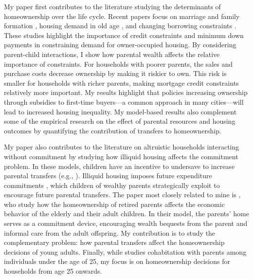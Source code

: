\documentclass[12pt]{article}
\begin{document}

My paper first contributes to the literature studying the determinants of homeownership over the life cycle. Recent papers focus on marriage and family formation \citep{Fisher2011,Chang2024,Khorunzhina2019}, housing demand in old age \citep{McGee2019,Barczyk2020a}, and changing borrowing constraints \citep{Paz-Pardo2019,Mabille2020}. These studies highlight the importance of credit constraints and minimum down payments in constraining demand for owner-occupied housing. By considering parent-child interactions, I show how parental wealth affects the relative importance of constraints. For households with poorer parents, the sales and purchase costs decrease ownership by making it riskier to own. This risk is smaller for households with richer parents, making mortgage credit constraints relatively more important. My results highlight that policies increasing ownership through subsidies to first-time buyers---a common approach in many cities---will lead to increased housing inequality. My model-based results also complement some of the empirical research on the effect of parental resources and housing outcomes \citep[see e.g.,][ for recent work]{wold2024housing,daysal2023intergenerational,benetton2022dynastic} by quantifying the contribution of transfers to homeownership.

My paper also contributes to the literature on altruistic households interacting without commitment by studying how illiquid housing affects the commitment problem. In these models, children have an incentive to undersave to increase parental transfers (e.g., \citealp{Altonji1997a,Boar2018,Barczyk2014,Chu2020}). Illiquid housing imposes future expenditure commitments \citep{Chetty2007,Shore2010}, which children of wealthy parents strategically exploit to encourage future parental transfers. The paper most closely related to mine is \cite{Barczyk2020a}, who study how the homeownership of retired parents affects the economic behavior of the elderly and their adult children. In their model, the parents' home serves as a commitment device, encouraging wealth bequests from the parent and informal care from the adult offspring. My contribution is to study the complementary problem: how parental transfers affect the homeownership decisions of young adults. Finally, while \cite{kaplan2012moving} studies cohabitation with parents among individuals under the age of 25, my focus is on homeownership decisions for households from age 25 onwards.
\end{document}
